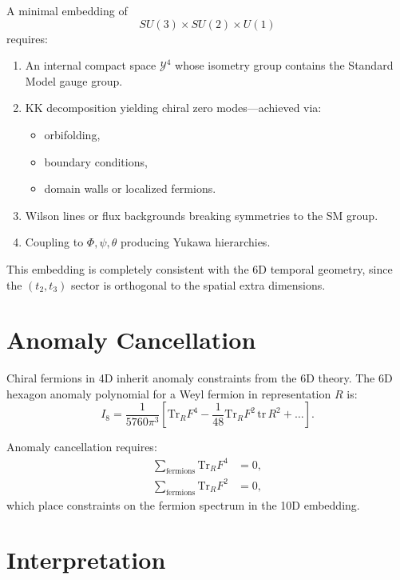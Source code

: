 \documentclass[12pt]{article}
\begin{document}
A minimal embedding of
\[
SU(3)\times SU(2)\times U(1)
\]
requires:

\begin{enumerate}
\item An internal compact space \(\mathcal{Y}^4\) whose isometry group
contains the Standard Model gauge group.
\item KK decomposition yielding chiral zero modes—achieved via:
  \begin{itemize}
  \item orbifolding,
  \item boundary conditions,
  \item domain walls or localized fermions.
  \end{itemize}
\item Wilson lines or flux backgrounds breaking symmetries to the SM group.
\item Coupling to \(\Phi,\psi,\theta\) producing Yukawa hierarchies.
\end{enumerate}

This embedding is completely consistent with the 6D temporal geometry, since
the \((t_2,t_3)\) sector is orthogonal to the spatial extra dimensions.


\newpage
\section{Anomaly Cancellation}

Chiral fermions in 4D inherit anomaly constraints from the 6D theory.  
The 6D hexagon anomaly polynomial for a Weyl fermion in representation \(R\) is:
\[
I_8 =
\frac{1}{5760\pi^3}
\left[
\mathrm{Tr}_R F^4
-\frac{1}{48}\mathrm{Tr}_R F^2\,\mathrm{tr}\,R^2
+ \dots
\right].
\]

Anomaly cancellation requires:
\begin{align}
\sum_{\text{fermions}} \mathrm{Tr}_R F^4 &= 0, \\
\sum_{\text{fermions}} \mathrm{Tr}_R F^2 &= 0,
\end{align}
which place constraints on the fermion spectrum in the 10D embedding.


\newpage
\section{Interpretation}
\end{document}
